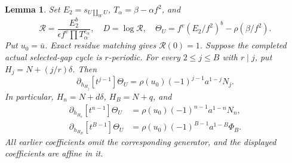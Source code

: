 \documentclass[11pt,a4paper]{amsart}
\numberwithin{equation}{section}
\theoremstyle{plain}
\newtheorem{lemma}[theorem]{Lemma}
\theoremstyle{definition}
\begin{document}
\begin{lemma}\label{lem:original-transfer}
Set \(E_2=s_{U\amalg_WU}\), \(T_\alpha=\beta-\alpha f^2\), and
\[
 \mathcal R=\frac{E_2^b}{\epsilon f^v\prod T_\alpha^{e_\alpha}},\quad
 D=\log\mathcal R,\quad
 \Theta_U=f^v(E_2/f^2)^b-\rho(\beta/f^2).
\]
Put \(u_0=\bar u\).  Exact residue matching gives \(\mathcal R(0)=1\).  Suppose the completed actual selected-gap cycle is \(r\)-periodic.  For every \(2\le j\le B\) with \(r\mid j\), put \(H_j=N+(j/r)\delta\).  Then
\[
 \partial_{h_{H_j}}[t^{j-1}]\Theta_U
 =\rho(u_0)(-1)^{j-1}a^{1-j}N_j.
\]
In particular, \(H_n=N+d\delta\), \(H_B=N+q\), and
\begin{align*}
 \partial_{h_{H_n}}[t^{n-1}]\Theta_U
 &=\rho(u_0)(-1)^{n-1}a^{1-n}N_n,\\
 \partial_{h_{H_B}}[t^{B-1}]\Theta_U
 &=\rho(u_0)(-1)^{B-1}a^{1-B}\Phi_B.
\end{align*}
All earlier coefficients omit the corresponding generator, and the displayed coefficients are affine in it.
\end{lemma}
\end{document}
